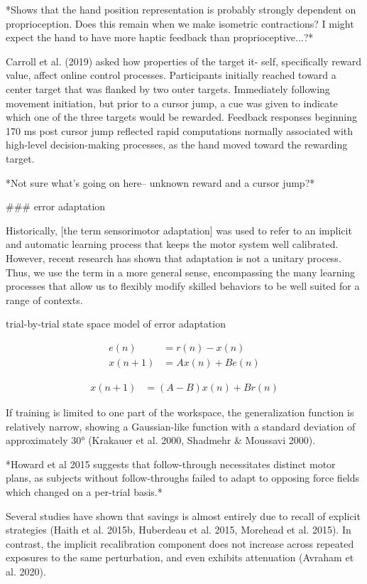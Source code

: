 \documentclass[../main.tex]{subfiles}
\begin{document}
{{{*Shows that the hand position representation is probably strongly dependent on proprioception. Does this remain when we make isometric contractions? I might expect the hand to have more haptic feedback than proprioceptive...?* 

Carroll et al. (2019) asked how properties of the target it- self, specifically reward value, affect online control processes. Participants initially reached toward a center target that was flanked by two outer targets. Immediately following movement initiation, but prior to a cursor jump, a cue was given to indicate which one of the three targets would be rewarded. Feedback responses beginning 170 ms post cursor jump reflected rapid computations normally associated with high-level decision-making processes, as the hand moved toward the rewarding target. 

*Not sure what's going on here-- unknown reward and a cursor jump?*


### error adaptation

Historically, [the term sensorimotor adaptation] was used to refer to an implicit and automatic learning process that keeps the motor system well calibrated. However, recent research has shown that adaptation is not a unitary process. Thus, we use the term in a more general sense, encompassing the many learning processes that allow us to flexibly modify skilled behaviors to be well suited for a range of contexts.


trial-by-trial state space model of error adaptation

\begin{align*}
e(n) &= r(n) - x(n) \\ 
x(n+1) &= Ax(n) + Be(n)
\end{align*}}

\begin{align*}
x(n+1) &= (A - B)x(n)+ Br(n)
\end{align*}

If training is limited to one part of the workspace, the generalization function is relatively narrow, showing a Gaussian-like function with a standard deviation of approximately 30° (Krakauer et al. 2000, Shadmehr & Moussavi 2000).

*Howard et al 2015 suggests that follow-through necessitates distinct motor plans, as subjects without follow-throughs failed to adapt to opposing force fields which changed on a per-trial basis.*

Several studies have shown that savings is almost entirely due to recall of explicit strategies (Haith et al. 2015b, Huberdeau et al. 2015, Morehead et al. 2015). In contrast, the implicit recalibration component does not increase across repeated exposures to the same perturbation, and even exhibits attenuation (Avraham et al. 2020).


}}
\end{document}
